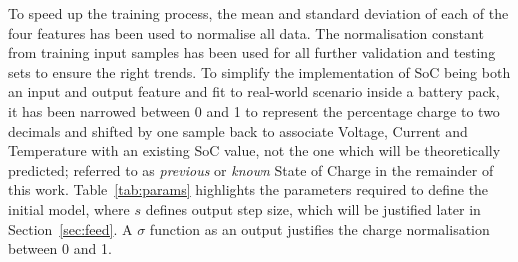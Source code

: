 %
%
{To speed up the training process, the mean and standard deviation of each of the four features has been used to normalise all data.}
The normalisation constant from training input samples has been used for all further validation and testing sets to ensure the right trends.
To simplify the implementation of SoC being both an input and output feature and fit to real-world scenario inside a battery pack, it has been narrowed between 0 and 1 to represent the percentage charge to two decimals and shifted by one sample back to associate Voltage, Current and Temperature with an existing SoC value, not the one which will be theoretically predicted; referred to as \textit{previous} or \textit{known} State of Charge in the remainder of this work.
\mbox{Table~\ref{tab:params}} highlights the parameters required to define the initial model, where $s$ defines output step size, which will be justified later in Section~\ref{sec:feed}.
A $\sigma$ function as an output justifies the charge normalisation between 0 and 1.
